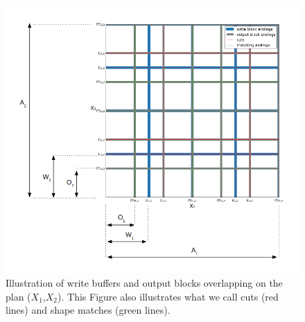 \documentclass[sigconf, nonacm]{acmart}
\begin{document}
\begin{figure}[h]
\centering
\includegraphics[scale=0.4]{./figures/baseline_figure.png}
\caption{Illustration of write buffers and output blocks overlapping on the plan
($X_1$,$X_2$). This Figure also illustrates what we call cuts (red lines) and
shape matches (green lines).}
\label{fig:baseline_figure}
\end{figure}
\end{document}
